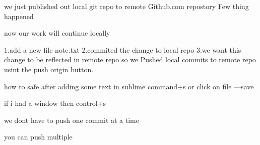 we just published out local git repo
to remote Github.com repostory
Few thing happened 



now our work will continue locally

1.add a new file note.txt
2.commited the change to local repo
3.we want this change to be reflected in remote
repo so we Pushed local commits to remote repo usint the push origin button.


how to safe after adding some text in sublime
command+s
or click on file ---save

if i had a window then control+s

we dont have to push one commit at a time

you can push multiple 